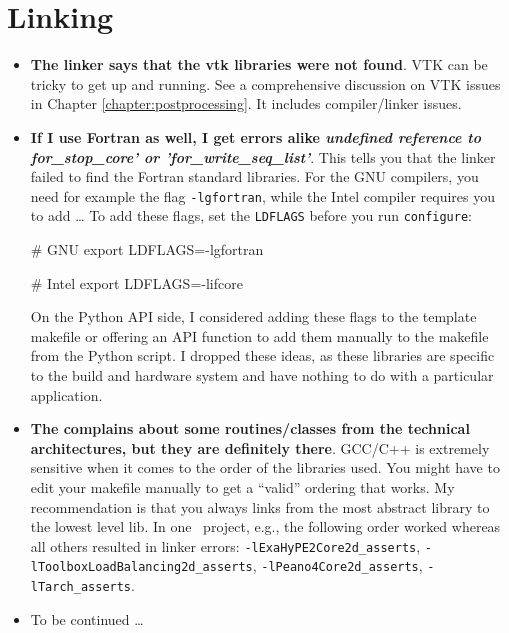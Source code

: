 \section{Linking}

\begin{itemize}
  \item \textbf{The linker says that the vtk libraries were not found}.
  VTK can be tricky to get up and running. See a comprehensive discussion on VTK
  issues in Chapter \ref{chapter:postprocessing}. It includes compiler/linker issues.
  \item \textbf{If I use Fortran as well, I get errors alike \emph{undefined
  reference to for\_stop\_core' or 'for\_write\_seq\_list'}}. This tells you
  that the linker failed to find the Fortran standard libraries. For the GNU
  compilers, you need for example the flag \texttt{-lgfortran}, while the Intel
  compiler requires you to add \ldots
  To add these flags, set the \texttt{LDFLAGS} before you run
  \texttt{configure}:
  \begin{code}
# GNU
export LDFLAGS=-lgfortran

# Intel
export LDFLAGS=-lifcore
  \end{code}
  On the Python API side, I considered adding these flags to the template
  makefile or offering an API function to add them manually to the makefile from
  the Python script. I dropped these ideas, as these libraries are specific to
  the build and hardware system and have nothing to do with a particular
  application.
  \item \textbf{The complains about some routines/classes from the technical
  architectures, but they are definitely there}.
  GCC/C++ is extremely sensitive when it comes to the order of the libraries
  used. You might have to edit your makefile manually to get a ``valid''
  ordering that works. My recommendation is that you always links from the most
  abstract library to the lowest level lib. In one \ExaHyPE\ project, e.g., the
  following order worked whereas all others resulted in linker errors:
  \texttt{-lExaHyPE2Core2d\_asserts},
  \texttt{-lToolboxLoadBalancing2d\_asserts}, \texttt{-lPeano4Core2d\_asserts},
  \texttt{-lTarch\_asserts}.
  \item To be continued \dots
\end{itemize}




